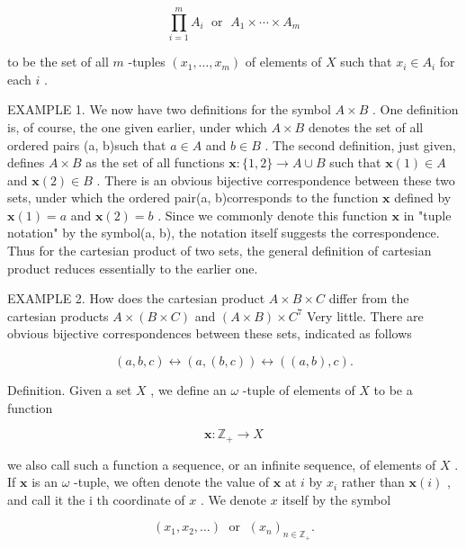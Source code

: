 \[
\mathop{\prod }\limits_{{i = 1}}^{m}{A}_{i}\;\text{ or }\;{A}_{1} \times  \cdots  \times  {A}_{m}
\]

to be the set of all \(m\) -tuples \(\left( {{x}_{1},\ldots ,{x}_{m}}\right)\) of elements of \(X\) such that \({x}_{i} \in  {A}_{i}\) for each \(i\) .

EXAMPLE 1. We now have two definitions for the symbol \(A \times  B\) . One definition is, of course, the one given earlier, under which \(A \times  B\) denotes the set of all ordered pairs (a, b)such that \(a \in  A\) and \(b \in  B\) . The second definition, just given, defines \(A \times  B\) as the set of all functions \(\mathbf{x} : \{ 1,2\}  \rightarrow  A \cup  B\) such that \(\mathbf{x}\left( 1\right)  \in  A\) and \(\mathbf{x}\left( 2\right)  \in  B\) . There is an obvious bijective correspondence between these two sets, under which the ordered pair(a, b)corresponds to the function \(\mathbf{x}\) defined by \(\mathbf{x}\left( 1\right)  = a\) and \(\mathbf{x}\left( 2\right)  = b\) . Since we commonly denote this function \(\mathbf{x}\) in "tuple notation" by the symbol(a, b), the notation itself suggests the correspondence. Thus for the cartesian product of two sets, the general definition of cartesian product reduces essentially to the earlier one.

EXAMPLE 2. How does the cartesian product \(A \times  B \times  C\) differ from the cartesian products \(A \times  \left( {B \times  C}\right)\) and \(\left( {A \times  B}\right)  \times  {C}^{7}\) Very little. There are obvious bijective correspondences between these sets, indicated as follows

\[
\left( {a,b,c}\right)  \leftrightarrow  \left( {a,\left( {b,c}\right) }\right)  \leftrightarrow  \left( {\left( {a,b}\right) ,c}\right) .
\]

Definition. Given a set \(X\) , we define an \(\omega\) -tuple of elements of \(X\) to be a function

\[
\mathbf{x} : {\mathbb{Z}}_{ + } \rightarrow  X
\]

we also call such a function a sequence, or an infinite sequence, of elements of \(X\) . If \(\mathbf{x}\) is an \(\omega\) -tuple, we often denote the value of \(\mathbf{x}\) at \(i\) by \({x}_{i}\) rather than \(\mathbf{x}\left( i\right)\) , and call it the i th coordinate of \(x\) . We denote \(x\) itself by the symbol

\[
\left( {{x}_{1},{x}_{2},\ldots }\right) \;\text{ or }\;{\left( {x}_{n}\right) }_{n \in  {\mathbb{Z}}_{ + }}.
\]

